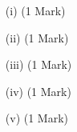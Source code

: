 


\begin{itemize}
\item[(i)] (1 Mark)

\item[(ii)] (1 Mark)

\item[(iii)] (1 Mark)

\item[(iv)] (1 Mark)

\item[(v)] (1 Mark)

\end{itemize}

